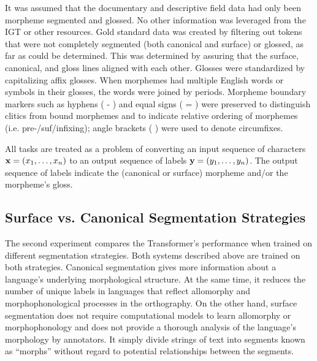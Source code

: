 It was assumed that the documentary and descriptive field data had only been morpheme segmented and glossed. No other information was leveraged from the IGT or other resources. Gold standard data was created by filtering out tokens that were not completely segmented (both canonical and surface) or glossed, as far as could be determined. This was determined by assuring that the surface, canonical, and gloss lines aligned with each other. 
Glosses were standardized by capitalizing affix glosses. When morphemes had multiple English words or symbols in their glosses, the words were joined by periods.
Morpheme boundary markers such as hyphens ( - ) and equal signs ( = ) were preserved to distinguish clitics from bound morphemes and to indicate relative ordering of morphemes (i.e. pre-/suf/infixing); angle brackets ( \textlangle{}\textrangle{} ) were used to denote circumfixes. 

All tasks are treated as a problem of converting an input sequence of characters $\mathbf{x} = (x_1, \ldots, x_n)$ to an output sequence of labels $\mathbf{y} = (y_1, \ldots, y_n)$. The output sequence of labels indicate the (canonical or surface) morpheme and/or the morpheme's gloss. 

\subsection{Surface vs. Canonical Segmentation Strategies}
\label{sec:sgstrategies}

The second experiment compares the Transformer's performance when trained on different segmentation strategies. Both systems described above are trained on both strategies. Canonical segmentation gives more information about a language's underlying morphological structure. At the same time, it reduces the number of unique labels in languages that reflect allomorphy and morphophonological processes in the orthography. On the other hand, surface segmentation does not require computational models to learn allomorphy or morphophonology \citep{goldsmith_computational_2017} and does not provide a thorough analysis of the language's morphology by annotators. It simply divide strings of text into segments known as ``morphs'' \citep{virpioja_empirical_2011} without regard to potential relationships between the segments. 

